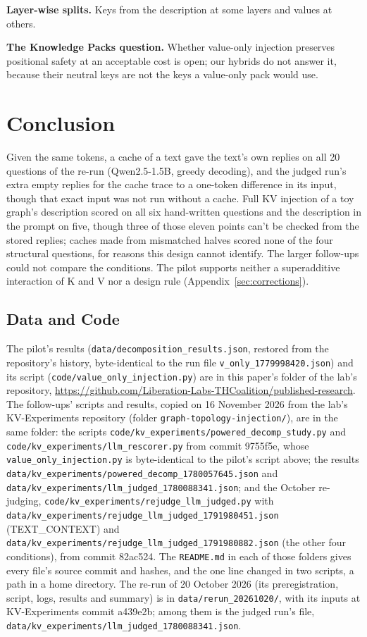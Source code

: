 \documentclass[11pt,a4paper]{article}
\begin{document}
\textbf{Layer-wise splits.} Keys from the description at some layers and values at others.

\textbf{The Knowledge Packs question.} Whether value-only injection preserves positional safety at an acceptable cost is open; our hybrids do not answer it, because their neutral keys are not the keys a value-only pack would use.

\section{Conclusion}

Given the same tokens, a cache of a text gave the text's own replies on all 20 questions of the re-run (Qwen2.5-1.5B, greedy decoding), and the judged run's extra empty replies for the cache trace to a one-token difference in its input, though that exact input was not run without a cache. Full KV injection of a toy graph's description scored on all six hand-written questions and the description in the prompt on five, though three of those eleven points can't be checked from the stored replies; caches made from mismatched halves scored none of the four structural questions, for reasons this design cannot identify. The larger follow-ups could not compare the conditions. The pilot supports neither a superadditive interaction of K and V nor a design rule (Appendix~\ref{sec:corrections}).

\subsection*{Data and Code}

The pilot's results (\nolinkurl{data/decomposition_results.json}, restored from the repository's history, byte-identical to the run file \nolinkurl{v_only_1779998420.json}) and its script (\nolinkurl{code/value_only_injection.py}) are in this paper's folder of the lab's repository, \url{https://github.com/Liberation-Labs-THCoalition/published-research}. The follow-ups' scripts and results, copied on 16 November 2026 from the lab's KV-Experiments repository (folder \nolinkurl{graph-topology-injection/}), are in the same folder: the scripts \nolinkurl{code/kv_experiments/powered_decomp_study.py} and \nolinkurl{code/kv_experiments/llm_rescorer.py} from commit 9755f5e, whose \nolinkurl{value_only_injection.py} is byte-identical to the pilot's script above; the results \nolinkurl{data/kv_experiments/powered_decomp_1780057645.json} and \nolinkurl{data/kv_experiments/llm_judged_1780088341.json}; and the October re-judging, \nolinkurl{code/kv_experiments/rejudge_llm_judged.py} with \nolinkurl{data/kv_experiments/rejudge_llm_judged_1791980451.json} (TEXT\_CONTEXT) and \nolinkurl{data/kv_experiments/rejudge_llm_judged_1791980882.json} (the other four conditions), from commit 82ac524. The \nolinkurl{README.md} in each of those folders gives every file's source commit and hashes, and the one line changed in two scripts, a path in a home directory. The re-run of 20 October 2026 (its preregistration, script, logs, results and summary) is in \nolinkurl{data/rerun_20261020/}, with its inputs at KV-Experiments commit a439e2b; among them is the judged run's file, \nolinkurl{data/kv_experiments/llm_judged_1780088341.json}.
\end{document}
